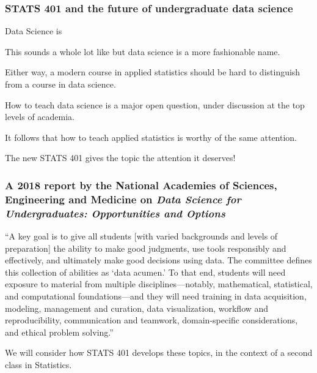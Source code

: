 \documentclass{beamer}
\begin{document}
 

\begin{frame}


  \vspace{5mm}
  
\frametitle{STATS 401 and the future of undergraduate data science}

\begin{myitemize}

\item Data Science is 

\item This sounds a whole lot like  but data science is a more fashionable name.

\item Either way, a modern course in applied statistics should be hard to distinguish from a course in data science.

\item How to teach data science is a major open question, under discussion at the top levels of academia.

\item It follows that how to teach applied statistics is worthy of the same attention.

\item The new STATS 401 gives the topic the attention it deserves!
\end{myitemize}
\end{frame}


\begin{frame}
\frametitle{A 2018 report by the National Academies of Sciences, Engineering and Medicine on {\em  Data Science for Undergraduates: Opportunities and Options}}


\begin{myitemize}

\item ``A key goal is to give all students [with varied backgrounds and levels of preparation] the ability to make good judgments, use tools responsibly and effectively, and ultimately make good decisions using data. The committee defines this collection of abilities as `data acumen.' To that end, students will need exposure to material from multiple disciplines---notably, mathematical, statistical, and computational foundations---and they will need training in data acquisition, modeling, management and curation, data visualization, workflow and reproducibility, communication and teamwork, domain-specific considerations, and ethical problem solving.''

\item We will consider how STATS 401 develops these topics, in the context of a second class in Statistics.

\end{myitemize}
\end{frame}
\end{document}
